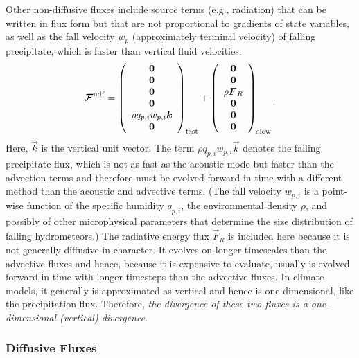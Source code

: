 \documentclass{article}
\begin{document}
Other non-diffusive fluxes include source terms (e.g., radiation) that can be written in flux form but that are not proportional to gradients of state variables, as well as the fall velocity $w_p$ (approximately terminal velocity) of falling precipitate, which is faster than vertical fluid velocities:
\begin{equation}
\boldsymbol{{\mathcal{F}}}^{\mathrm{ndf}} = 
\left( \begin{array}{c}
\boldsymbol{{0}} \\
\boldsymbol{{0}} \\
\boldsymbol{{0}} \\
\boldsymbol{{0}} \\
\rho q_{p,i} w_{p, i} \boldsymbol{{k}} \\
\boldsymbol{{0}} 
\end{array}
\right)_{\mathrm{fast}} + 
\left( \begin{array}{c}
\boldsymbol{{0}} \\
\boldsymbol{{0}} \\
\rho \boldsymbol{{F}}_R\\
\boldsymbol{{0}} \\
\boldsymbol{{0}} \\
\boldsymbol{{0}} 
\end{array}
\right)_{\mathrm{slow}}.
\label{eq:ndf_flux}
\end{equation}
Here, $\vec{k}$ is the vertical unit vector.  The term $\rho q_{p,i} w_{p, i} \vec{k}$ denotes the falling precipitate flux, which is not as fast as the acoustic mode but faster than the advection terms and therefore must be evolved forward in time with a different method than the acoustic and advective terms. (The fall velocity $w_{p, i}$ is a point-wise function of the specific humidity $q_{p,i}$, the environmental density $\rho$, and possibly of other microphysical parameters that determine the size distribution of falling hydrometeors.) The radiative energy flux $\vec{F}_R$ is included here because it is not generally diffusive in character. It evolves on longer timescales than the advective fluxes and hence, because it is expensive to evaluate, usually is evolved forward in time with longer timesteps than the advective fluxes. In climate models, it generally is approximated as vertical and hence is one-dimensional, like the precipitation flux. Therefore, \emph{the divergence of these two fluxes is a one-dimensional (vertical) divergence}.

\subsubsection{Diffusive Fluxes}
\end{document}

